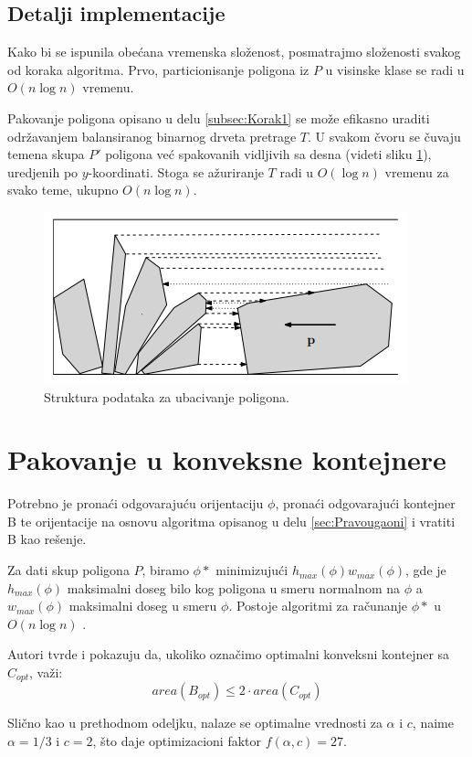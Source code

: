 \documentclass[a4paper]{article}
\theoremstyle{plain}
\theoremstyle{definition}
\begin{document}
\subsection{Detalji implementacije}
\label{subsec:Implementacija}

Kako bi se ispunila obe\'c{}ana vremenska slo\v{z}enost, posmatrajmo slo\v{z}enosti svakog od koraka algoritma. Prvo, particionisanje poligona iz $P$ u visinske klase se radi u $O(n\log{}n)$ vremenu.

Pakovanje poligona opisano u delu \ref{subsec:Korak1} se mo\v{z}e efikasno uraditi odr\v{z}avanjem balansiranog binarnog drveta pretrage $T$. U svakom \v{c}voru se \v{c}uvaju temena skupa $P'$ poligona ve\'c{} spakovanih vidljivih sa desna (videti sliku \ref{fig2}), uredjenih po $y$-koordinati. Stoga se a\v{z}uriranje $T$ radi u $O(\log{}n)$ vremenu za svako teme, ukupno $O(n\log{}n)$. 

\begin{figure}[H]
    \centering
    \includegraphics[scale=0.5]{resources/fig2.PNG}
    \caption{Struktura podataka za ubacivanje poligona.}
    \label{fig2}
\end{figure}


\section{Pakovanje u konveksne kontejnere}
\label{sec:Konveksni}

Potrebno je prona\'c{}i odgovaraju\'c{}u orijentaciju $\phi$, prona\'c{}i odgovaraju\'c{}i kontejner B te orijentacije na osnovu algoritma opisanog u delu \ref{sec:Pravougaoni} i vratiti B kao re\v{s}enje.

Za dati skup poligona $P$, biramo $\phi*$  minimizuju\'c{}i $h_{max}(\phi)w_{max}(\phi)$, gde je $h_{max}(\phi)$ maksimalni doseg bilo kog poligona u smeru normalnom na $\phi$ a $w_{max}(\phi)$ maksimalni doseg u smeru $\phi$. Postoje algoritmi za ra\v{c}unanje $\phi*$ u $O(n\log{}n)$ \cite{BuildingThreeConvexPolygons}.

Autori tvrde i pokazuju da, ukoliko ozna\v{c}imo optimalni konveksni kontejner sa $C_{opt}$, va\v{z}i: $$area(B_{opt}) \leq 2 \cdot area(C_{opt})$$

Sli\v{c}no kao u prethodnom odeljku, nalaze se optimalne vrednosti za $\alpha$ i $c$, naime $\alpha = 1/3$ i $c = 2$, \v{s}to daje optimizacioni faktor $f(\alpha, c) = 27$.


\appendix



\end{document}
